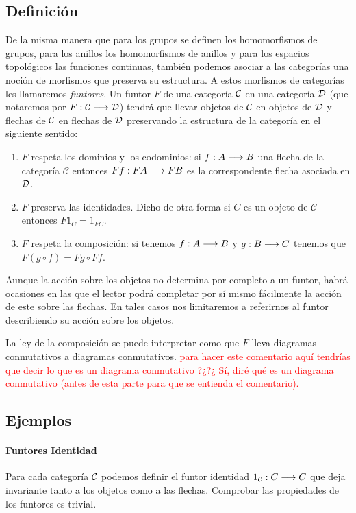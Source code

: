 \subsection{Definición}
De la misma manera que para los grupos se definen los homomorfismos
de grupos, para los anillos los homomorfismos de anillos y para los
espacios topológicos las funciones continuas, también
podemos asociar a las categorías una noción de morfismos que preserva
su estructura. A estos morfismos de categorías les llamaremos
\emph{funtores}. Un funtor $F$ de una categoría
$\mathcal{C}$ en una categoría $\mathcal{D}$ (que notaremos por $F : \mathcal{C}\longrightarrow \mathcal{D}$)
tendrá que llevar objetos de $\mathcal{C}$ en objetos de $\mathcal{D}$ y flechas
de $\mathcal{C}$ en flechas de $\mathcal{D}$ preservando la estructura de la
categoría en el siguiente sentido:
\begin{enumerate}
\item $F$ respeta los dominios y los codominios:
si $f : A\longrightarrow B$ una flecha
de la categoría $\mathcal{C}$ entonces
$F f : F A\longrightarrow F B$ es la correspondente flecha asociada
en $\mathcal{D}$.
\item $F$ preserva las identidades. Dicho de otra forma si $C$ es un
objeto de $\mathcal{C}$ entonces $F 1_C = 1_{F C}$.
\item $F$ respeta la composición: si tenemos $f: A\longrightarrow B$ y
$g : B\longrightarrow C$ tenemos que $F (g\circ f) = F g \circ F f$.
\end{enumerate}

Aunque la acción sobre los objetos
no determina por completo a un funtor, habrá ocasiones en las que
el lector podrá completar por sí mismo fácilmente la acción de este
sobre las flechas. En tales casos nos limitaremos a referirnos
al funtor describiendo su acción sobre los objetos.

La ley de la composición se puede interpretar como que $F$ lleva
diagramas conmutativos a diagramas conmutativos. \textcolor{red}{para hacer este comentario aquí tendrías que decir lo que  es un diagrama conmutativo ?¿?¿ Sí, diré qué es un diagrama conmutativo (antes de esta parte para que se entienda el comentario).}


\subsection{Ejemplos}
\paragraph{Funtores Identidad}
Para cada categoría $\mathcal{C}$ podemos definir el funtor identidad
$1_{\mathcal{C}} : C\longrightarrow C$ que deja invariante tanto a los objetos
como a las flechas. Comprobar las propiedades de los funtores
es trivial.

